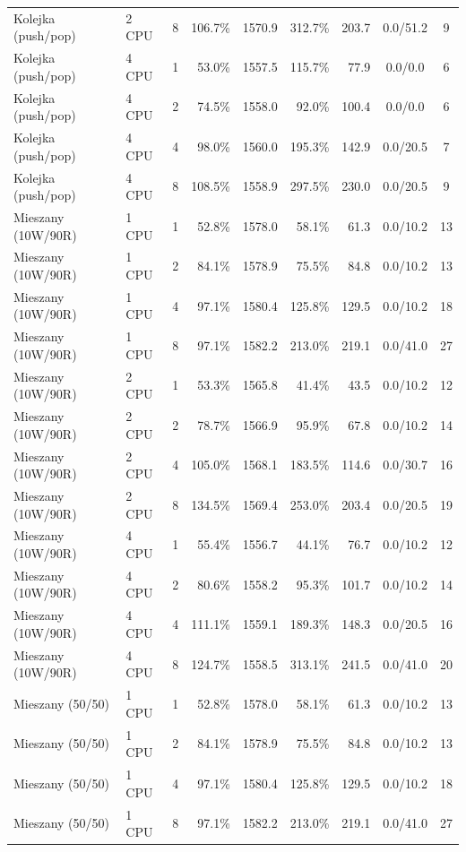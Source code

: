 \begin{table}[ht]
{\begin{tabular}{llcrrrrcc}
Kolejka (push/pop) & 2 CPU & 8 & 106.7\% & 1570.9 & 312.7\% & 203.7 & 0.0/51.2 & 9 \\
Kolejka (push/pop) & 4 CPU & 1 & 53.0\% & 1557.5 & 115.7\% & 77.9 & 0.0/0.0 & 6 \\
Kolejka (push/pop) & 4 CPU & 2 & 74.5\% & 1558.0 & 92.0\% & 100.4 & 0.0/0.0 & 6 \\
Kolejka (push/pop) & 4 CPU & 4 & 98.0\% & 1560.0 & 195.3\% & 142.9 & 0.0/20.5 & 7 \\
Kolejka (push/pop) & 4 CPU & 8 & 108.5\% & 1558.9 & 297.5\% & 230.0 & 0.0/20.5 & 9 \\
Mieszany (10W/90R) & 1 CPU & 1 & 52.8\% & 1578.0 & 58.1\% & 61.3 & 0.0/10.2 & 13 \\
Mieszany (10W/90R) & 1 CPU & 2 & 84.1\% & 1578.9 & 75.5\% & 84.8 & 0.0/10.2 & 13 \\
Mieszany (10W/90R) & 1 CPU & 4 & 97.1\% & 1580.4 & 125.8\% & 129.5 & 0.0/10.2 & 18 \\
Mieszany (10W/90R) & 1 CPU & 8 & 97.1\% & 1582.2 & 213.0\% & 219.1 & 0.0/41.0 & 27 \\
Mieszany (10W/90R) & 2 CPU & 1 & 53.3\% & 1565.8 & 41.4\% & 43.5 & 0.0/10.2 & 12 \\
Mieszany (10W/90R) & 2 CPU & 2 & 78.7\% & 1566.9 & 95.9\% & 67.8 & 0.0/10.2 & 14 \\
Mieszany (10W/90R) & 2 CPU & 4 & 105.0\% & 1568.1 & 183.5\% & 114.6 & 0.0/30.7 & 16 \\
Mieszany (10W/90R) & 2 CPU & 8 & 134.5\% & 1569.4 & 253.0\% & 203.4 & 0.0/20.5 & 19 \\
Mieszany (10W/90R) & 4 CPU & 1 & 55.4\% & 1556.7 & 44.1\% & 76.7 & 0.0/10.2 & 12 \\
Mieszany (10W/90R) & 4 CPU & 2 & 80.6\% & 1558.2 & 95.3\% & 101.7 & 0.0/10.2 & 14 \\
Mieszany (10W/90R) & 4 CPU & 4 & 111.1\% & 1559.1 & 189.3\% & 148.3 & 0.0/20.5 & 16 \\
Mieszany (10W/90R) & 4 CPU & 8 & 124.7\% & 1558.5 & 313.1\% & 241.5 & 0.0/41.0 & 20 \\
Mieszany (50/50) & 1 CPU & 1 & 52.8\% & 1578.0 & 58.1\% & 61.3 & 0.0/10.2 & 13 \\
Mieszany (50/50) & 1 CPU & 2 & 84.1\% & 1578.9 & 75.5\% & 84.8 & 0.0/10.2 & 13 \\
Mieszany (50/50) & 1 CPU & 4 & 97.1\% & 1580.4 & 125.8\% & 129.5 & 0.0/10.2 & 18 \\
Mieszany (50/50) & 1 CPU & 8 & 97.1\% & 1582.2 & 213.0\% & 219.1 & 0.0/41.0 & 27 \\

\end{tabular}}
\end{table}
